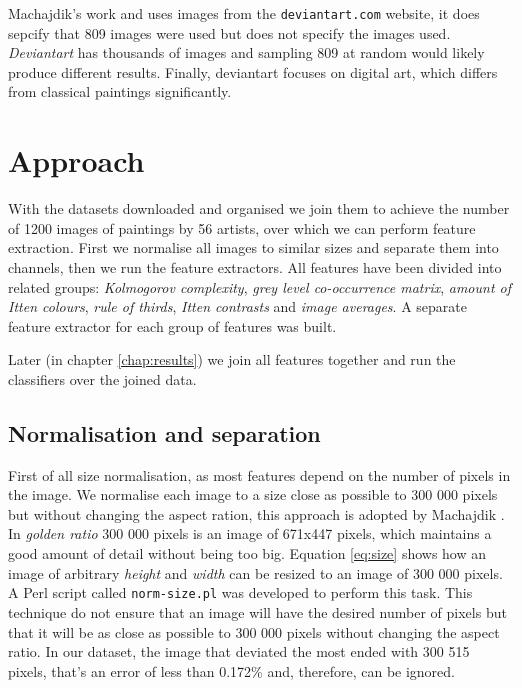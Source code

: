 \documentclass[11pt,a4paper,draft]{report}
\begin{document}
\begin{multicols}{2}
Machajdik's work \cite{mach10clas} and \cite{mach10ua} uses images from the
\texttt{deviantart.com} website, it does sepcify that 809 images were used but
does not specify the images used.  \emph{Deviantart} has thousands of images
and sampling 809 at random would likely produce different results.  Finally,
deviantart focuses on digital art, which differs from classical paintings
significantly.

\end{multicols}

\chapter{Approach}  %
\label{chap:approach}

\begin{multicols}{2}

With the datasets downloaded and organised we join them to achieve the number
of 1200 images of paintings by 56 artists, over which we can perform feature
extraction.  First we normalise all images to similar sizes and separate them
into channels, then we run the feature extractors.  All features have been
divided into related groups: \emph{Kolmogorov complexity}, \emph{grey level
co-occurrence matrix}, \emph{amount of Itten colours}, \emph{rule of thirds},
\emph{Itten contrasts} and \emph{image averages}.  A separate feature extractor
for each group of features was built.

Later (in chapter \ref{chap:results}) we join all features together and run the
classifiers over the joined data.

\section{Normalisation and separation}

First of all size normalisation, as most features depend on the number of
pixels in the image.  We normalise each image to a size close as possible to
300 000 pixels but without changing the aspect ration, this approach is adopted
by Machajdik \cite{mach10clas}.  In \emph{golden ratio} 300 000 pixels is an
image of 671x447 pixels, which maintains a good amount of detail without being
too big.  Equation \ref{eq:size} shows how an image of arbitrary \emph{height}
and \emph{width} can be resized to an image of 300 000 pixels.  A Perl script
called \texttt{norm-size.pl} was developed to perform this task.  This
technique do not ensure that an image will have the desired number of pixels
but that it will be as close as possible to 300 000 pixels without changing the
aspect ratio.  In our dataset, the image that deviated the most ended with 300
515 pixels, that's an error of less than 0.172\% and, therefore, can be
ignored.


\end{multicols}
\end{document}
